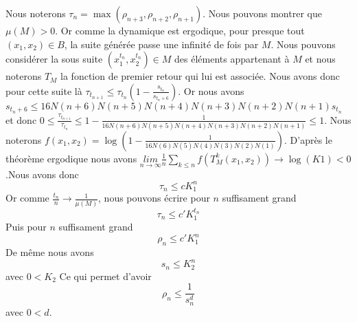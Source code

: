\documentclass[12pt]{article}
\theoremstyle{plain}%
\theoremstyle{definition}
\theoremstyle{remark}
\begin{document}
Nous noterons $\tau_n=\max{(\rho_{n+3},\rho_{n+2},\rho_{n+1})}$.\newline
Nous pouvons montrer que $\mu(M)>0$. Or comme la dynamique est ergodique, pour presque tout $(x_1,x_2) \in B$, la suite générée passe une infinité de fois par $M$. Nous pouvons considérer la sous suite $(x_1^{t_n},x_2^{t_n})\in M$ des éléments appartenant à $M$ et nous noterons $T_M$ la fonction de premier retour qui lui est associée. Nous avons donc pour cette suite là $\tau_{t_{n+1}} \leq \tau_{t_{n}}(1-\frac{s_{t_n}}{s_{t_n+6}})$. \newline
Or nous avons $s_{t_n+6} \leq 16 N(n+6)N(n+5)N(n+4)N(n+3)N(n+2)N(n+1)s_{t_n}$ et donc $0 \leq \frac{\tau_{t_{n+1}}}{\tau_{t_{n}}} \leq 1-\frac{1}{16 N(n+6)N(n+5)N(n+4)N(n+3)N(n+2)N(n+1)} \leq 1$. Nous noterons $f(x_1,x_2)=\log(1-\frac{1}{16 N(6)N(5)N(4)N(3)N(2)N(1)})$.
D'après le théorème ergodique nous avons $\underset{n \to \infty}{lim}\frac{1}{n}\sum_{k \leq n}f(T_M^k(x_1,x_2)) \to \log(K1) <0$.Nous avons donc\[
\tau_n \leq c K_1^{n}
\]
Or comme $\frac{t_n}{n} \to \frac{1}{\mu(M)}$, nous pouvons écrire pour $n$ suffisament grand\[
\tau_n \leq c' K_1^{t_n}
\]
Puis pour $n$ suffisament grand\[
\rho_n \leq c' K_1^n
\]
De même nous avons\[
s_n \leq K_2^n
\]
avec $0<K_2$ Ce qui permet d'avoir \[
\rho_n \leq \frac{1}{s_n^d}
\]avec $0<d$.
\end{document}
